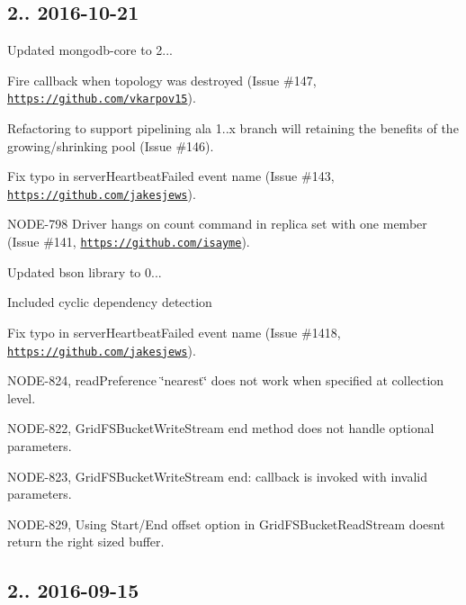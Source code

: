 \subsection*{2.. 2016-\/10-\/21 }


\begin{DoxyItemize}
\item Updated mongodb-\/core to 2...
\begin{DoxyItemize}
\item Fire callback when topology was destroyed (Issue \#147, \href{https://github.com/vkarpov15}{\tt https\+://github.\+com/vkarpov15}).
\item Refactoring to support pipelining ala 1..\+x branch will retaining the benefits of the growing/shrinking pool (Issue \#146).
\item Fix typo in server\+Heartbeat\+Failed event name (Issue \#143, \href{https://github.com/jakesjews}{\tt https\+://github.\+com/jakesjews}).
\item N\+O\+D\+E-\/798 Driver hangs on count command in replica set with one member (Issue \#141, \href{https://github.com/isayme}{\tt https\+://github.\+com/isayme}).
\end{DoxyItemize}
\item Updated bson library to 0...
\begin{DoxyItemize}
\item Included cyclic dependency detection
\end{DoxyItemize}
\item Fix typo in server\+Heartbeat\+Failed event name (Issue \#1418, \href{https://github.com/jakesjews}{\tt https\+://github.\+com/jakesjews}).
\item N\+O\+D\+E-\/824, read\+Preference \char`\"{}nearest\char`\"{} does not work when specified at collection level.
\item N\+O\+D\+E-\/822, Grid\+F\+S\+Bucket\+Write\+Stream end method does not handle optional parameters.
\item N\+O\+D\+E-\/823, Grid\+F\+S\+Bucket\+Write\+Stream end\+: callback is invoked with invalid parameters.
\item N\+O\+D\+E-\/829, Using Start/\+End offset option in Grid\+F\+S\+Bucket\+Read\+Stream doesn\textquotesingle{}t return the right sized buffer.
\end{DoxyItemize}

\subsection*{2.. 2016-\/09-\/15 }


